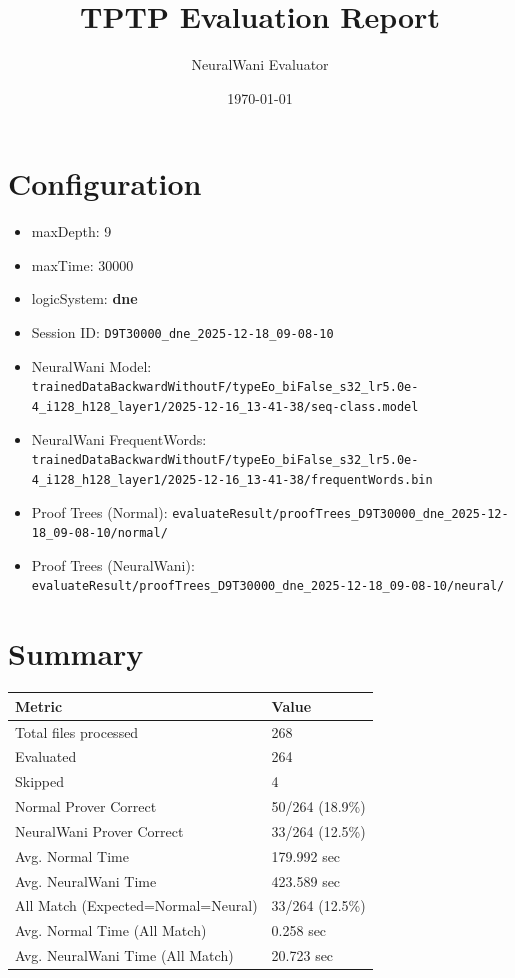 \documentclass[a4paper,10pt]{article}
\title{TPTP Evaluation Report}
\author{NeuralWani Evaluator}
\date{\today}
\begin{document}
\maketitle

\section{Configuration}
\begin{itemize}
\item maxDepth: 9
\item maxTime: 30000
\item logicSystem: \textbf{dne}
\item Session ID: \texttt{D9T30000\_dne\_2025-12-18\_09-08-10}
\item NeuralWani Model: \texttt{trainedDataBackwardWithoutF/typeEo\_biFalse\_s32\_lr5.0e-4\_i128\_h128\_layer1/2025-12-16\_13-41-38/seq-class.model}
\item NeuralWani FrequentWords: \texttt{trainedDataBackwardWithoutF/typeEo\_biFalse\_s32\_lr5.0e-4\_i128\_h128\_layer1/2025-12-16\_13-41-38/frequentWords.bin}
\item Proof Trees (Normal): \texttt{evaluateResult/proofTrees\_D9T30000\_dne\_2025-12-18\_09-08-10/normal/}
\item Proof Trees (NeuralWani): \texttt{evaluateResult/proofTrees\_D9T30000\_dne\_2025-12-18\_09-08-10/neural/}
\end{itemize}

\section{Summary}

\begin{tabular}{ll}
\toprule
\textbf{Metric} & \textbf{Value} \\
\midrule
Total files processed & 268 \\
Evaluated & 264 \\
Skipped & 4 \\
\midrule
Normal Prover Correct & 50/264 (18.9\%) \\
NeuralWani Prover Correct & 33/264 (12.5\%) \\
\midrule
Avg. Normal Time & 179.992 sec \\
Avg. NeuralWani Time & 423.589 sec \\
\midrule
All Match (Expected=Normal=Neural) & 33/264 (12.5\%) \\
Avg. Normal Time (All Match) & 0.258 sec \\
Avg. NeuralWani Time (All Match) & 20.723 sec \\
\bottomrule
\end{tabular}
\end{document}
